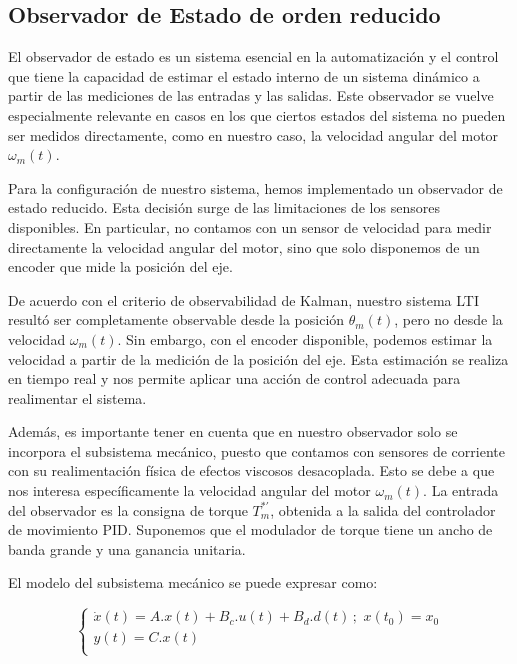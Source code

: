 \documentclass{article}
\begin{document}

\subsection{Observador de Estado de orden reducido}

El observador de estado es un sistema esencial en la automatización y el control que tiene la capacidad de 
estimar el estado interno de un sistema dinámico a partir de las mediciones de las entradas y las salidas. 
Este observador se vuelve especialmente relevante en casos en los que ciertos estados del sistema no pueden 
ser medidos directamente, como en nuestro caso, la velocidad angular del motor $\omega_m(t)$.

Para la configuración de nuestro sistema, hemos implementado un observador de estado reducido. Esta 
decisión surge de las limitaciones de los sensores disponibles. En particular, no contamos con un sensor 
de velocidad para medir directamente la velocidad angular del motor, sino que solo disponemos de un 
encoder que mide la posición del eje.

De acuerdo con el criterio de observabilidad de Kalman, nuestro sistema LTI resultó ser completamente 
observable desde la posición $\theta_m(t)$, pero no desde la velocidad $\omega_m(t)$. Sin embargo, con el 
encoder disponible, podemos estimar la velocidad a partir de la medición de la posición del eje. Esta 
estimación se realiza en tiempo real y nos permite 
aplicar una acción de control adecuada para realimentar el sistema.

Además, es importante tener en cuenta que en nuestro observador solo se incorpora el subsistema mecánico, 
puesto que contamos con sensores de corriente con su realimentación física de efectos viscosos desacoplada. 
Esto se debe a que nos interesa específicamente la velocidad angular del motor $\omega_m(t)$. La entrada del 
observador es la consigna de torque $T_m^{* \prime}$, obtenida a la salida del controlador de movimiento PID. 
Suponemos que el modulador de torque tiene un ancho de banda grande y una ganancia unitaria.

El modelo del subsistema mecánico se puede expresar como:

\begin{equation}
    \begin{cases}
        \dot{x}(t) = A.x(t) + B_c.u(t) +B_d.d(t)  \, ; \,\, x(t_0) = x_0\\
        y(t) = C.x(t) \\
    \end{cases}
\end{equation}
\end{document}
